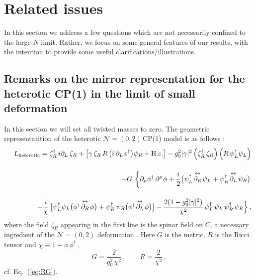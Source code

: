 \documentclass[epsfig,12pt]{article}
\def\beq{\begin{equation}}
\def\eeq{\end{equation}}
\def\beqn{\begin{eqnarray}}
\def\eeqn{\end{eqnarray}}
\newcommand{\nzt}{${\mathcal N}=(0,2)\,$}
\def\beqn{\begin{eqnarray}}
\def\eeqn{\end{eqnarray}}
\def\beq{\begin{equation}}
\def\eeq{\end{equation}}
\begin{document}
{\newpage

\section{Related issues}
\label{relais}
\setcounter{equation}{0}

In this section we  address a few questions which are not necessarily confined to the large-$N$ limit.
Rather, we focus on some general features of our results, with the intention to provide
some useful clarifications/illustrations.


\subsection{Remarks on the mirror representation
for the heterotic CP(1) in the limit of small deformation}


In this section we will set all twisted masses to zero.
The geometric representatition of  the heterotic \nzt CP(1) model is as follows \cite{SY1}:
\beqn
&&
L_{{\rm heterotic}}= 
\zeta_R^\dagger \, i\partial_L \, \zeta_R  + 
\left[\gamma \, \zeta_R  \,R\,  \big( i\,\partial_{L}\phi^{\dagger} \big)\psi_R
+{\rm H.c.}\right] -g_0^2|\gamma |^2 \left(\zeta_R^\dagger\, \zeta_R
\right)\left(R\,  \psi_L^\dagger\psi_L\right)
\nonumber
\\[4mm]
&&
+
G\, \left\{\rule{0mm}{5mm}
\partial_\mu \phi^\dagger\, \partial^\mu\phi  
+\frac{i}{2}\big(\psi_L^\dagger\!\stackrel{\leftrightarrow}{\partial_R}\!\psi_L 
+ \psi_R^\dagger\!\stackrel{\leftrightarrow}{\partial_L}\!\psi_R
\big)\right.
\nonumber
\\[4mm] 
&&
-\frac{i}{\chi}\,  \big[\psi_L^\dagger \psi_L
\big(\phi^\dagger \!\stackrel{\leftrightarrow}{\partial_R}\!\phi
\big)+ \psi_R^\dagger\, \psi_R
\big(\phi^\dagger\!\stackrel{\leftrightarrow}{\partial_L}\!\phi
\big)
\big]
-
\frac{2(1- g_0^2 |\gamma |^2)}{\chi^2}\,\psi_L^\dagger\,\psi_L \,\psi_R^\dagger\,\psi_R
\Big\}\,,
\label{AAone}
\eeqn
where the field $\zeta_R$ appearing in the first line is
the spinor field on $C$, a  necessary ingredient  of the ${\mathcal N}=(0,2)$ deformation
\cite{EdTo}.
Here $G$ is the metric, $R$ is the Ricci tensor and $\chi \equiv 1+\phi\,\phi^\dagger\,,$
\beq
G=
\frac{2}{g_{0}^2\,\chi^{2}}\,,\qquad R =\frac{2}{\chi^2}\,,
\label{fsmetrone}
\eeq
cf. Eq.~(\ref{eq:RG}).

}
\end{document}
